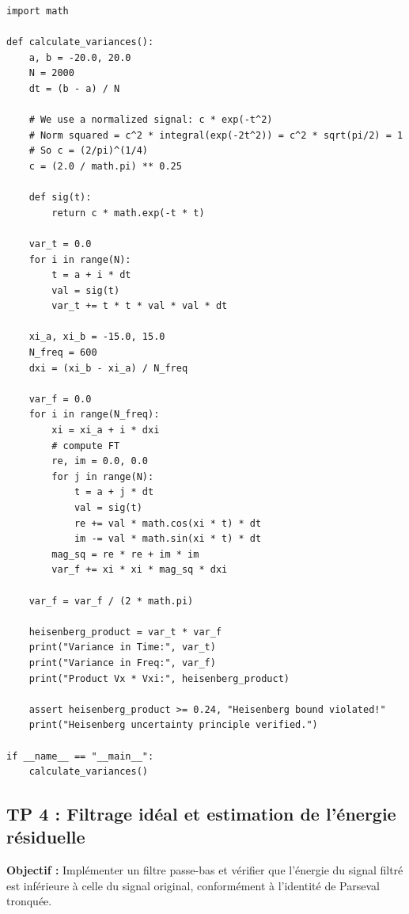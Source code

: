 \documentclass[11pt,a4paper]{article}
\begin{document}
\begin{lstlisting}
import math

def calculate_variances():
    a, b = -20.0, 20.0
    N = 2000
    dt = (b - a) / N

    # We use a normalized signal: c * exp(-t^2)
    # Norm squared = c^2 * integral(exp(-2t^2)) = c^2 * sqrt(pi/2) = 1
    # So c = (2/pi)^(1/4)
    c = (2.0 / math.pi) ** 0.25

    def sig(t):
        return c * math.exp(-t * t)

    var_t = 0.0
    for i in range(N):
        t = a + i * dt
        val = sig(t)
        var_t += t * t * val * val * dt

    xi_a, xi_b = -15.0, 15.0
    N_freq = 600
    dxi = (xi_b - xi_a) / N_freq

    var_f = 0.0
    for i in range(N_freq):
        xi = xi_a + i * dxi
        # compute FT
        re, im = 0.0, 0.0
        for j in range(N):
            t = a + j * dt
            val = sig(t)
            re += val * math.cos(xi * t) * dt
            im -= val * math.sin(xi * t) * dt
        mag_sq = re * re + im * im
        var_f += xi * xi * mag_sq * dxi

    var_f = var_f / (2 * math.pi)

    heisenberg_product = var_t * var_f
    print("Variance in Time:", var_t)
    print("Variance in Freq:", var_f)
    print("Product Vx * Vxi:", heisenberg_product)

    assert heisenberg_product >= 0.24, "Heisenberg bound violated!"
    print("Heisenberg uncertainty principle verified.")

if __name__ == "__main__":
    calculate_variances()
\end{lstlisting}



\subsection*{TP 4 : Filtrage idéal et estimation de l'énergie résiduelle}

\textbf{Objectif :} Implémenter un filtre passe-bas et vérifier que l'énergie du signal filtré est inférieure à celle du signal original, conformément à l'identité de Parseval tronquée.
\end{document}

